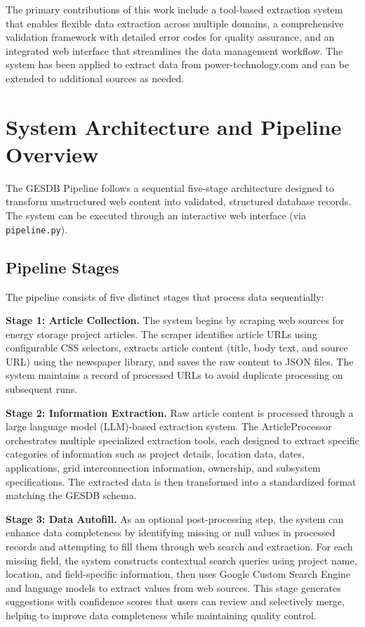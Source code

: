 \documentclass[11pt]{article}
\begin{document}
The primary contributions of this work include a tool-based extraction system that enables flexible data extraction across multiple domains, a comprehensive validation framework with detailed error codes for quality assurance, and an integrated web interface that streamlines the data management workflow. The system has been applied to extract data from power-technology.com and can be extended to additional sources as needed.

\section{System Architecture and Pipeline Overview}
\label{sec:architecture}

The GESDB Pipeline follows a sequential five-stage architecture designed to transform unstructured web content into validated, structured database records. The system can be executed through an interactive web interface (via \texttt{pipeline.py}).

\subsection{Pipeline Stages}

The pipeline consists of five distinct stages that process data sequentially:

\textbf{Stage 1: Article Collection.} The system begins by scraping web sources for energy storage project articles. The scraper identifies article URLs using configurable CSS selectors, extracts article content (title, body text, and source URL) using the newspaper library, and saves the raw content to JSON files. The system maintains a record of processed URLs to avoid duplicate processing on subsequent runs.

\textbf{Stage 2: Information Extraction.} Raw article content is processed through a large language model (LLM)-based extraction system. The ArticleProcessor orchestrates multiple specialized extraction tools, each designed to extract specific categories of information such as project details, location data, dates, applications, grid interconnection information, ownership, and subsystem specifications. The extracted data is then transformed into a standardized format matching the GESDB schema.

\textbf{Stage 3: Data Autofill.} As an optional post-processing step, the system can enhance data completeness by identifying missing or null values in processed records and attempting to fill them through web search and extraction. For each missing field, the system constructs contextual search queries using project name, location, and field-specific information, then uses Google Custom Search Engine and language models to extract values from web sources. This stage generates suggestions with confidence scores that users can review and selectively merge, helping to improve data completeness while maintaining quality control.
\end{document}
